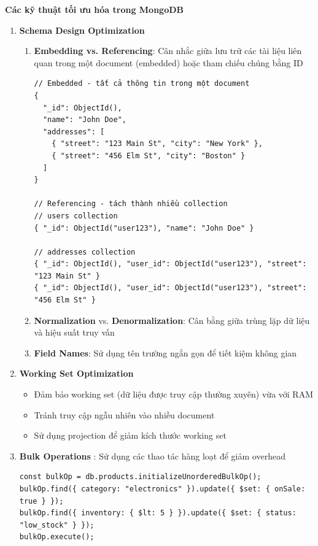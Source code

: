 \textbf{Các kỹ thuật tối ưu hóa trong MongoDB}

\begin{enumerate}
    \item \textbf{Schema Design Optimization}
    \begin{enumerate}
        \item \textbf{Embedding vs. Referencing}: Cân nhắc giữa lưu trữ các tài liệu liên quan trong một document (embedded) hoặc tham chiếu chúng bằng ID
\begin{lstlisting}[style=mongodb, caption=Ví dụ Embedding vs. Referencing trong MongoDB, label=mongodb:example]
// Embedded - tất cả thông tin trong một document
{
  "_id": ObjectId(),
  "name": "John Doe",
  "addresses": [
    { "street": "123 Main St", "city": "New York" },
    { "street": "456 Elm St", "city": "Boston" }
  ]
}

// Referencing - tách thành nhiều collection
// users collection
{ "_id": ObjectId("user123"), "name": "John Doe" }

// addresses collection
{ "_id": ObjectId(), "user_id": ObjectId("user123"), "street": "123 Main St" }
{ "_id": ObjectId(), "user_id": ObjectId("user123"), "street": "456 Elm St" }
\end{lstlisting}
        \item \textbf{Normalization} vs. \textbf{Denormalization}: Cân bằng giữa trùng lặp dữ liệu và hiệu suất truy vấn
        \item \textbf{Field Names}: Sử dụng tên trường ngắn gọn để tiết kiệm không gian
    \end{enumerate}

    \item \textbf{Working Set Optimization}
    \begin{itemize}
        \item Đảm bảo working set (dữ liệu được truy cập thường xuyên) vừa với RAM
        \item Tránh truy cập ngẫu nhiên vào nhiều document
        \item Sử dụng projection để giảm kích thước working set
    \end{itemize}

    \item \textbf{Bulk Operations} : Sử dụng các thao tác hàng loạt để giảm overhead
\begin{lstlisting}[style=mongodb, caption=Ví dụ Bulk Operations trong MongoDB, label=mongodb:example]
const bulkOp = db.products.initializeUnorderedBulkOp();
bulkOp.find({ category: "electronics" }).update({ $set: { onSale: true } });
bulkOp.find({ inventory: { $lt: 5 } }).update({ $set: { status: "low_stock" } });
bulkOp.execute();
\end{lstlisting}


\end{enumerate}
